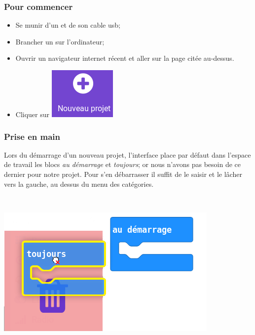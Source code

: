 \subsubsection{Pour commencer}

\begin{itemize}
  \item Se munir d'un \mb et de son cable usb;
  \item Brancher un \mb sur l'ordinateur;
  \item Ouvrir un navigateur internet récent et aller sur la page citée au-dessus.
  \item Cliquer sur \includegraphics[width=0.1\linewidth]{res/mb-makecode_1erProg_nouvProj.png}
\end{itemize}


\subsubsection{Prise en main}

\begin{minipage}[t]{0.75\linewidth}
Lors du démarrage d'un nouveau projet, l'interface place par défaut dans l'espace de travail les blocs \emph{au démarrage} et \emph{toujours}; or nous n'avons pas besoin de ce dernier pour notre projet. Pour s'en débarrasser il suffit de le saisir et le lâcher vers la gauche, au dessus du menu des catégories.
\end{minipage}
\hfill
\begin{minipage}[t]{0.25\linewidth}~\\
  \vspace{-5mm}
  \begin{center}
    \includegraphics[scale=0.3]{res/mb-makecode_1erProg_suppr.png}
  \end{center}
\end{minipage}

